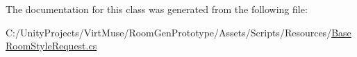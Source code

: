 The documentation for this class was generated from the following file\+:\begin{DoxyCompactItemize}
\item 
C\+:/\+Unity\+Projects/\+Virt\+Muse/\+Room\+Gen\+Prototype/\+Assets/\+Scripts/\+Resources/\mbox{\hyperlink{_base_room_style_request_8cs}{Base\+Room\+Style\+Request.\+cs}}\end{DoxyCompactItemize}
